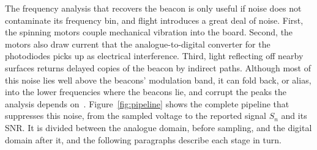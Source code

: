 The frequency analysis that recovers the beacon is only useful if noise does not contaminate its frequency bin, and flight introduces a great deal of noise. First, the spinning motors couple mechanical vibration into the board. Second, the motors also draw current that the analogue-to-digital converter for the photodiodes picks up as electrical interference. Third, light reflecting off nearby surfaces returns delayed copies of the beacon by indirect paths. Although most of this noise lies well above the beacons' modulation band, it can fold back, or alias, into the lower frequencies where the beacons lie, and corrupt the peaks the analysis depends on~\cite{oppenheim1999dsp}. Figure~\ref{fig:pipeline} shows the complete pipeline that suppresses this noise, from the sampled voltage to the reported signal $S_n$ and its SNR. It is divided between the analogue domain, before sampling, and the digital domain after it, and the following paragraphs describe each stage in turn.

